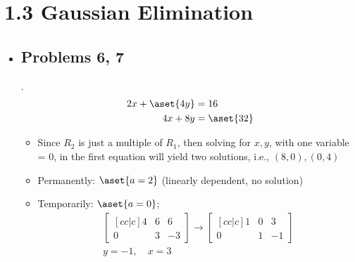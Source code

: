 \section{1.3 Gaussian Elimination}
\begin{itemize}
  \item []

  \subsection{Problems 6, 7}
  \begin{enumerate}
    .
    \vspace{-30pt}
    \begin{align*}
      2x + \aset{4y} &= 16  \\
      4x + 8y &= \aset{32}
    \end{align*}
    \begin{itemize}
      \item Since \( R_2 \) is just a multiple of \( R_1 \), then solving for
        \( x,y \), with one variable = 0, in the first equation will yield two
        solutions, i.e., \( (8,0), (0,4) \)
    \end{itemize}


    \begin{itemize}
      \item Permanently: \( \aset{a = 2} \) (linearly dependent, no solution)
      \item Temporarily: \( \aset{a = 0} \);
        \begin{align*}
          \begin{bmatrix}[cc|c]
          4 & 6 & 6  \\
          0 & 3 & -3
          \end{bmatrix} \rightarrow
          \begin{bmatrix}[cc|c]
          1 & 0 & 3  \\
          0 & 1 & -1
          \end{bmatrix} \\
          y = -1, \quad x = 3
        \end{align*}
    \end{itemize}


\end{enumerate}
\end{itemize}
